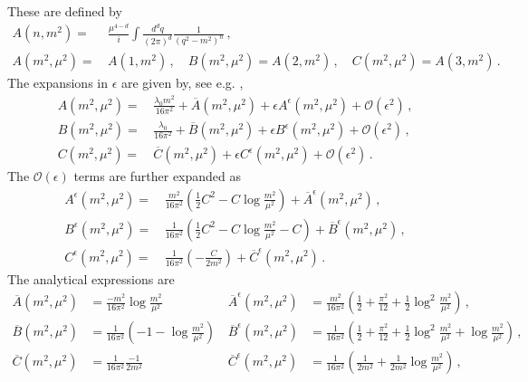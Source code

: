 \documentclass[12pt,a4paper]{article}
\begin{document}
These are defined by
\begin{align}
A(n,m^2) =\,& \frac{\mu^{4-d}}{i}\int \frac{d^d q}{\left(2\pi\right)^d}
\frac{1}{\left(q^2-m^2\right)^n}\,,
\nonumber\\
A(m^2,\mu^2) =\,& A(1,m^2)\,,\quad B(m^2,\mu^2) = A(2,m^2)\,,\quad C(m^2,\mu^2) = A(3,m^2)\,.
\end{align}
The expansions in $\epsilon$ are given by, see e.g. \cite{Amoros:1999dp},
\begin{align}
A(m^2,\mu^2) = \,&\frac{\lambda_0 m^2}{16\pi^2}+\overline A(m^2,\mu^2)
+\epsilon A^\epsilon(m^2,\mu^2) +\mathcal{O}(\epsilon^2)\,,
\nonumber\\
B(m^2,\mu^2) = \,&\frac{\lambda_0 }{16\pi^2}+\overline B(m^2,\mu^2)
+\epsilon B^\epsilon(m^2,\mu^2) +\mathcal{O}(\epsilon^2)\,,
\nonumber\\
C(m^2,\mu^2) = \,&\overline C(m^2,\mu^2)
+\epsilon C^\epsilon(m^2,\mu^2) +\mathcal{O}(\epsilon^2)\,.
\end{align}
The $\mathcal{O}(\epsilon)$ terms are further expanded as
\begin{align}
A^\epsilon(m^2,\mu^2) =\, & \frac{m^2}{16\pi^2}
\left(\frac{1}{2}C^2-C\log\frac{m^2}{\mu^2}\right)+\overline A^\epsilon(m^2,\mu^2)\,,
\nonumber\\
B^\epsilon(m^2,\mu^2) =\, & \frac{1}{16\pi^2}
\left(\frac{1}{2}C^2-C\log\frac{m^2}{\mu^2}-C\right)+\overline B^\epsilon(m^2,\mu^2)\,,
\nonumber\\
C^\epsilon(m^2,\mu^2) =\, & \frac{1}{16\pi^2}
\left(-\frac{C}{2m^2}\right)+\overline C^\epsilon(m^2,\mu^2)\,.
\end{align}
The analytical expressions are
\begin{align}
\overline A(m^2,\mu^2) &= \frac{-m^2}{16\pi^2}\log\frac{m^2}{\mu^2}\,
&  \overline A^\epsilon(m^2,\mu^2) &= \frac{m^2}{16\pi^2}
\left(\frac{1}{2}+\frac{\pi^2}{12}+\frac{1}{2}\log^2\frac{m^2}{\mu^2}\right)\,,
\nonumber\\
\overline B(m^2,\mu^2) &= \frac{1}{16\pi^2}\left(-1-\log\frac{m^2}{\mu^2}\right)\,
&  \overline B^\epsilon(m^2,\mu^2) &= \frac{1}{16\pi^2}
\left(\frac{1}{2}+\frac{\pi^2}{12}+\frac{1}{2}\log^2\frac{m^2}{\mu^2}+\log\frac{m^2}{\mu^2}\right)\,,
\nonumber\\
\overline C(m^2,\mu^2) &= \frac{1}{16\pi^2}\frac{-1}{2m^2}\,
&  \overline C^\epsilon(m^2,\mu^2) &= \frac{1}{16\pi^2}
\left(\frac{1}{2m^2}+\frac{1}{2m^2}\log\frac{m^2}{\mu^2}\right)\,,
\end{align}
\end{document}
